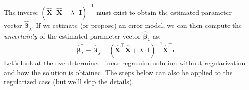 \documentclass{article}[11pt]
\begin{document}
The inverse $\left(\hat{\mathbf{X}}^{\top}\hat{\mathbf{X}}+\lambda\cdot\mathbf{I}\right)^{-1}$ must exist to obtain the estimated parameter vector $\hat{\mathbf{\beta}}_{\lambda}$.
If we estimate (or propose) an error model, we can then compute the \textit{uncertainty} of the estimated parameter vector $\hat{\mathbf{\beta}}_{\lambda}$ as:
\begin{equation*}
\hat{\mathbf{\beta}}^{\dagger}_{\lambda} = \hat{\mathbf{\beta}}_{\lambda} - \left(\hat{\mathbf{X}}^{\top}\hat{\mathbf{X}}+\lambda\cdot\mathbf{I}\right)^{-1}\hat{\mathbf{X}}^{\top}\mathbf{\epsilon}
\end{equation*}
Let's look at the overdetermined linear regression solution without regularization and how the solution is obtained.
The steps below can also be applied to the regularized case (but we'll skip the details).
\end{document}

